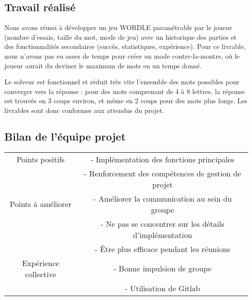 \subsection{Travail réalisé}


\tabto{1cm}Nous avons réussi à développer un jeu WORDLE paramétrable par le joueur (nombre d'essais, taille du mot, mode de jeu) avec un historique des parties et des fonctionnalités secondaires (succès, statistiques, expérience). Pour ce livrable, nous n'avons pas eu assez de temps pour créer un mode contre-la-montre, où le joueur aurait du deviner le maximum de mots en un temps donné.

\tabto{1cm}Le solveur est fonctionnel et réduit très vite l'ensemble des mots possibles pour converger vers la réponse : pour des mots comprenant de 4 à 8 lettres, la réponse est trouvée en 3 coups environ, et même en 2 coups pour des mots plus longs. Les livrables sont donc conformes aux attendus du projet.

\subsection{Bilan de l'équipe projet}

{\begin{center}
\begin{tabular}{|c|c|}
\hline Points positifs & - Implémentation des fonctions principales  \\
& - Renforcement des compétences de gestion de projet \\
\hline Points à améliorer & - Améliorer la communication au sein du groupe \\
& - Ne pas se concentrer sur les détails d'implémentation \\
& - Être plus efficace pendant les réunions \\
\hline Expérience collective & - Bonne impulsion de groupe \\
& - Utilisation de Gitlab \\
\hline
\end{tabular}
\end{center}}

